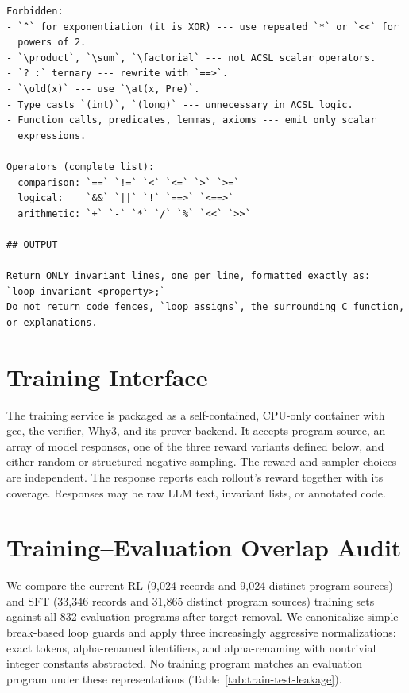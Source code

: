 \begin{promptbox}
\begin{lstlisting}[style=promptstyle]
Forbidden:
- `^` for exponentiation (it is XOR) --- use repeated `*` or `<<` for
  powers of 2.
- `\product`, `\sum`, `\factorial` --- not ACSL scalar operators.
- `? :` ternary --- rewrite with `==>`.
- `\old(x)` --- use `\at(x, Pre)`.
- Type casts `(int)`, `(long)` --- unnecessary in ACSL logic.
- Function calls, predicates, lemmas, axioms --- emit only scalar
  expressions.

Operators (complete list):
  comparison: `==` `!=` `<` `<=` `>` `>=`
  logical:    `&&` `||` `!` `==>` `<==>`
  arithmetic: `+` `-` `*` `/` `%` `<<` `>>`

## OUTPUT

Return ONLY invariant lines, one per line, formatted exactly as:
`loop invariant <property>;`
Do not return code fences, `loop assigns`, the surrounding C function,
or explanations.
\end{lstlisting}
\end{promptbox}

\section{Training Interface}
\label{app:service}

The training service is packaged as a self-contained, CPU-only container with
gcc, the verifier, Why3, and its prover backend.  It accepts program source,
an array of model responses, one of the three reward variants defined below,
and either random or structured negative sampling.  The reward and sampler
choices are independent.  The response reports each rollout's
reward together with its coverage.  Responses may be raw LLM text, invariant lists, or annotated
code.

\section{Training--Evaluation Overlap Audit}
\label{app:data-leakage}

We compare the current RL (9,024 records and 9,024 distinct program sources)
and SFT (33,346 records and 31,865 distinct program sources) training sets
against all 832 evaluation programs after target removal.  We canonicalize
simple break-based loop guards and apply three increasingly aggressive
normalizations: exact tokens, alpha-renamed identifiers, and alpha-renaming
with nontrivial integer constants abstracted.  No training program matches
an evaluation program under these representations
(Table~\ref{tab:train-test-leakage}).

